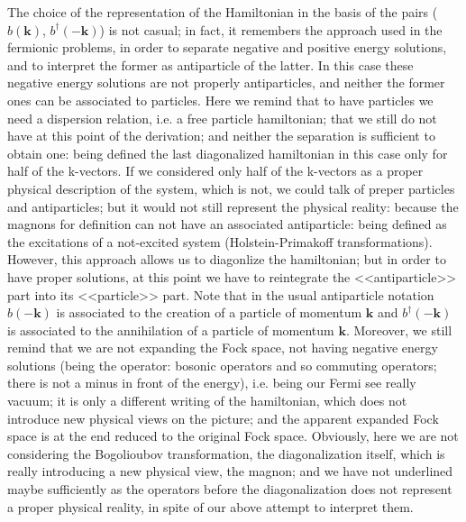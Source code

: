 \documentclass[a4paper,12pt]{article}
\begin{document}
            The choice of the representation of the Hamiltonian in the basis of the pairs 
            ($b(\boldsymbol{k})$, $b^{\dag}(-\boldsymbol{k})$) is not casual; 
            in fact, it remembers the approach used in the fermionic problems, 
            in order to separate negative and positive energy solutions, 
            and to interpret the former as antiparticle of the latter. 
            In this case these negative energy solutions are not properly antiparticles, 
            and neither the former ones can be associated to particles. 
            Here we remind that to have particles we need a dispersion relation, 
            i.e. a free particle hamiltonian; that we still do not have at this point 
            of the derivation; and neither the separation is sufficient to obtain one: 
            being defined the last diagonalized hamiltonian in this case only for half of the k-vectors. 
            If we considered only half of the k-vectors as a proper physical description of the system, 
            which is not, we could talk of preper particles and antiparticles; 
            but it would not still represent the physical reality: because the magnons for definition 
            can not have an associated antiparticle: being defined as the excitations of a not-excited system 
            (Holstein-Primakoff transformations). However, this approach allows us to diagonlize the hamiltonian; 
            but in order to have proper solutions, at this point we have to reintegrate 
            the <<antiparticle>> part into its <<particle>> part. Note that in the usual 
            antiparticle notation $b(-\boldsymbol{k})$ is associated to the creation of a particle 
            of momentum $\boldsymbol{k}$ and $b^{\dag}(-\boldsymbol{k})$ is associated to the annihilation of 
            a particle of momentum $\boldsymbol{k}$. Moreover, we still remind that we are not expanding 
            the Fock space, not having negative energy solutions (being the operator: bosonic operators 
            and so commuting operators; there is not a minus in front of the energy), 
            i.e. being our Fermi see really vacuum; it is only a different writing of the hamiltonian, 
            which does not introduce new physical views on the picture; and the apparent expanded 
            Fock space is at the end reduced to the original Fock space. Obviously, 
            here we are not considering the Bogolioubov transformation, the diagonalization itself, 
            which is really introducing a new physical view, the magnon; and we have not underlined 
            maybe sufficiently as the operators before the diagonalization does not represent a proper 
            physical reality, in spite of our above attempt to interpret them.
\end{document}
